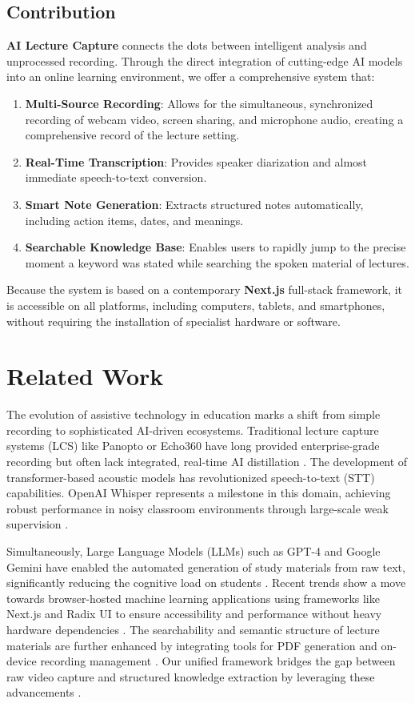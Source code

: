 \documentclass[runningheads]{llncs}
\begin{document}
\subsection{Contribution}
\textbf{AI Lecture Capture} connects the dots between intelligent analysis and unprocessed recording. Through the direct integration of cutting-edge AI models into an online learning environment, we offer a comprehensive system that:
\begin{enumerate}
    \item \textbf{Multi-Source Recording}: Allows for the simultaneous, synchronized recording of webcam video, screen sharing, and microphone audio, creating a comprehensive record of the lecture setting.
    \item \textbf{Real-Time Transcription}: Provides speaker diarization and almost immediate speech-to-text conversion.
    \item \textbf{Smart Note Generation}: Extracts structured notes automatically, including action items, dates, and meanings.
    \item \textbf{Searchable Knowledge Base}: Enables users to rapidly jump to the precise moment a keyword was stated while searching the spoken material of lectures.
\end{enumerate}

Because the system is based on a contemporary \textbf{Next.js} full-stack framework, it is accessible on all platforms, including computers, tablets, and smartphones, without requiring the installation of specialist hardware or software.

\section{Related Work}
The evolution of assistive technology in education marks a shift from simple recording to sophisticated AI-driven ecosystems. Traditional lecture capture systems (LCS) like Panopto or Echo360 have long provided enterprise-grade recording but often lack integrated, real-time AI distillation \cite{peverly,wang2024}. The development of transformer-based acoustic models has revolutionized speech-to-text (STT) capabilities. OpenAI Whisper represents a milestone in this domain, achieving robust performance in noisy classroom environments through large-scale weak supervision \cite{openai2022,whisper}. 

Simultaneously, Large Language Models (LLMs) such as GPT-4 and Google Gemini have enabled the automated generation of study materials from raw text, significantly reducing the cognitive load on students \cite{gpt4,google2024}. Recent trends show a move towards browser-hosted machine learning applications using frameworks like Next.js and Radix UI to ensure accessibility and performance without heavy hardware dependencies \cite{nextjs,react,radix}. The searchability and semantic structure of lecture materials are further enhanced by integrating tools for PDF generation and on-device recording management \cite{hertzen2022,rillmann2023,recordrtc}. Our unified framework bridges the gap between raw video capture and structured knowledge extraction by leveraging these advancements \cite{attention,supabase,zustand}.
\end{document}
